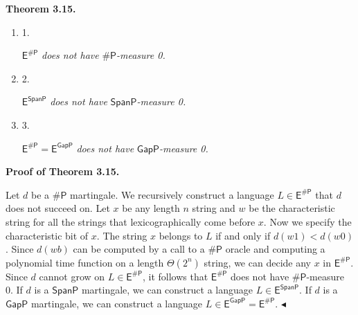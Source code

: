 \documentclass[10pt,a4paper]{article}
\begin{document}


\par\medskip\noindent\textbf{
\textbf{Theorem 3.15}\textbf{.}
}\par



\begin{enumerate}


\item[] 
1. 


$\mathsf{E}^{{\mathsf{\#}\mathsf{P}}}$\emph{ does not have }${\mathsf{\#}\mathsf{P}}$\emph{-measure 0.}\par





\item[] 
2. 


$\mathsf{E}^{\mathsf{SpanP}}$\emph{ does not have }$\mathsf{SpanP}$\emph{-measure 0.}\par





\item[] 
3. 


$\mathsf{E}^{{\mathsf{\#}\mathsf{P}}}=\mathsf{E}^{\mathsf{GapP}}$\emph{ does not have }$\mathsf{GapP}$\emph{-measure 0.}\par





\end{enumerate}






\par\medskip\noindent\textbf{Proof of Theorem 3.15.}\par




Let $d$ be a ${\mathsf{\#}\mathsf{P}}$ martingale. We recursively construct a language
$L\in\mathsf{E}^{{\mathsf{\#}\mathsf{P}}}$ that $d$ does not succeed on. Let $x$ be any length $n$
string and $w$ be the characteristic string for all the strings that
lexicographically come before $x$. Now we specify the characteristic bit of
$x$. The string $x$ belongs to $L$ if and only if $d(w1)<d(w0)$. Since
$d(wb)$ can be computed by a call to a ${\mathsf{\#}\mathsf{P}}$ oracle and computing a
polynomial time function on a length $\Theta(2^{n})$ string, we can decide any $x$ in $\mathsf{E}^{\mathsf{\#}\mathsf{P}}$. Since $d$ cannot grow on
$L\in\mathsf{E}^{\mathsf{\#}\mathsf{P}}$, it follows that $\mathsf{E}^{\mathsf{\#}\mathsf{P}}$ does not have ${\mathsf{\#}\mathsf{P}}$-measure 0. If $d$ is a $\mathsf{SpanP}$ martingale, we can construct a language $L\in\mathsf{E}^{\mathsf{SpanP}}$. If $d$ is a $\mathsf{GapP}$ martingale, we can construct a language $L\in\mathsf{E}^{\mathsf{GapP}}=\mathsf{E}^{{\mathsf{\#}\mathsf{P}}}$.
$\blacktriangleleft$\par
\end{document}
